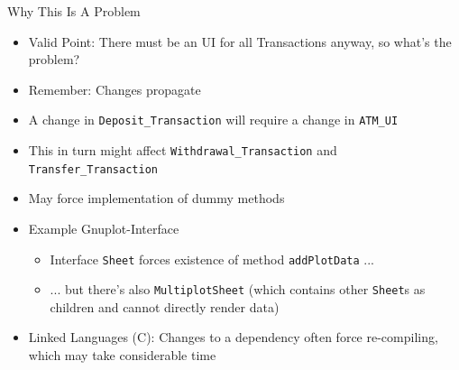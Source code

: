 
\begin{frame}{Why This Is A Problem}
%
\begin{itemize}
\item Valid Point: There must be an UI for all Transactions anyway, so what's the problem?
\pause
\item Remember: Changes propagate
\item A change in \texttt{Deposit\_Transaction} will require a change in \texttt{ATM\_UI}
\item This in turn might affect \texttt{Withdrawal\_Transaction} and \texttt{Transfer\_Transaction}
\pause
\item May force implementation of dummy methods
\item Example Gnuplot-Interface
	\begin{itemize}
	\item Interface \texttt{Sheet} forces existence of method \texttt{addPlotData} ...
	\item ... but there's also \texttt{MultiplotSheet} (which contains other \texttt{Sheet}s as children and cannot directly render data)
	\end{itemize}
\pause
\item Linked Languages (\zB C): Changes to a dependency often force re-compiling, which may take considerable time
\end{itemize}
%
\end{frame}


